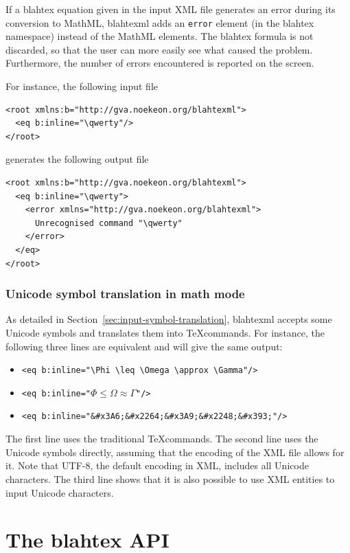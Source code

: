 \documentclass{article}
\begin{document}
If a blahtex equation given in the input XML file generates an error during its conversion to MathML, blahtexml adds an \texttt{error} element (in the blahtex namespace) instead of the MathML elements. The blahtex formula is not discarded, so that the user can more easily see what caused the problem. Furthermore, the number of errors encountered is reported on the screen.

For instance, the following input file
\begin{verbatim}
<root xmlns:b="http://gva.noekeon.org/blahtexml">
  <eq b:inline="\qwerty"/>
</root>
\end{verbatim}
generates the following output file
\begin{verbatim}
<root xmlns:b="http://gva.noekeon.org/blahtexml">
  <eq b:inline="\qwerty">
    <error xmlns="http://gva.noekeon.org/blahtexml">
      Unrecognised command "\qwerty"
    </error>
  </eq>
</root>
\end{verbatim}

\subsubsection{Unicode symbol translation in math mode}\label{sec:blahtexml-input-symbol-translation}

As detailed in Section~\ref{sec:input-symbol-translation}, blahtexml accepts some Unicode symbols and translates them into \TeX commands. For instance, the following three lines are equivalent and will give the same output:
\begin{itemize}
\item \verb|<eq b:inline="\Phi \leq \Omega \approx \Gamma"/>|
\item \verb|<eq b:inline="|$\Phi \leq \Omega \approx \Gamma$\verb|"/>|
\item \verb|<eq b:inline="&#x3A6;&#x2264;&#x3A9;&#x2248;&#x393;"/>|
\end{itemize}

The first line uses the traditional \TeX commands. The second line uses the Unicode symbols directly, assuming that the encoding of the XML file allows for it. Note that UTF-8, the default encoding in XML, includes all Unicode characters. The third line shows that it is also possible to use XML entities to input Unicode characters.

\section{The blahtex API}\label{sec:API}
\end{document}
